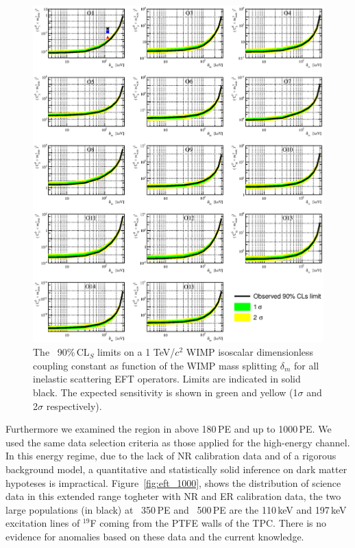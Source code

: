\begin{figure}
\begin{minipage}{1.\linewidth}
\centerline{\includegraphics[width=\textwidth,height=0.99\textheight,keepaspectratio]{Figures/FinalInelastic.eps}}
\end{minipage}
\caption{The \Xehund\ 90\%\,CL$_S$ limits on a 1 TeV/$c^2$ WIMP isoscalar dimensionless coupling constant as function of the WIMP mass splitting $\delta_m$  for all inelastic scattering EFT operators. Limits are indicated in solid black. The expected sensitivity is shown in green and yellow (1$\sigma$ and 2$\sigma$ respectively). }
\label{fig:InelasticLimit}
\end{figure}

Furthermore we examined the region in \cSi{} above 180\,PE and up to 1000\,PE. We used the same data selection criteria as those applied for the high-energy channel. 
In this energy regime, due to the lack of NR calibration data and of a rigorous background model, a quantitative and statistically solid inference on dark
matter hypoteses is impractical. Figure~\ref{fig:eft_1000}, shows the distribution of science data in this extended range togheter with NR and ER calibration data,
the two large populations (in black) at ~350\,PE and ~500\,PE are the 110\,keV and 197\,keV excitation lines of $^{19}$F coming from the PTFE walls of the TPC. 
There is no evidence for anomalies based on these data and the current knowledge.


